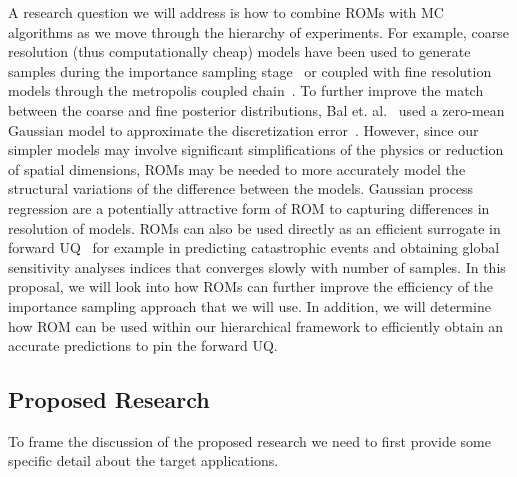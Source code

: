 \documentclass[11pt]{article}
\begin{document}
A research question we will address is how to combine ROMs with MC algorithms as we move through the hierarchy of experiments.
For example, coarse resolution (thus computationally cheap) models have been used to generate  samples
during the importance sampling stage~\cite{Higdon:2002vx,Christen:2005wp,Efendiev:2007uw,Bal:2013tp} or
coupled with fine resolution models through the metropolis coupled chain~\cite{Higdon:2002vx}.
To further improve the match between the coarse and fine posterior distributions, Bal et. al.~\cite{Bal:2013tp} used
a zero-mean Gaussian model to approximate the discretization error~\cite{Kaipio:2007ux}.
However, since our simpler models may involve significant simplifications of the physics or reduction of spatial dimensions,
ROMs may be needed to more accurately model the structural variations of the difference between the models. 
Gaussian process regression are a potentially attractive form of ROM to capturing differences in resolution of models.  
ROMs can also be used directly as an efficient surrogate in forward UQ~\cite{Challenor:2012uv, Ratto:2012tf} for example in predicting catastrophic events and obtaining global sensitivity analyses indices that converges slowly with number of samples.   In this proposal, we will look into how ROMs can further improve the efficiency of the importance sampling approach that we will use.  In addition, we will determine how ROM can be used within our hierarchical framework to efficiently obtain an accurate predictions to pin the forward UQ.


\subsection*{Proposed Research}

To frame the discussion of the proposed research we need to first provide some specific detail
about the target applications.
\end{document}

